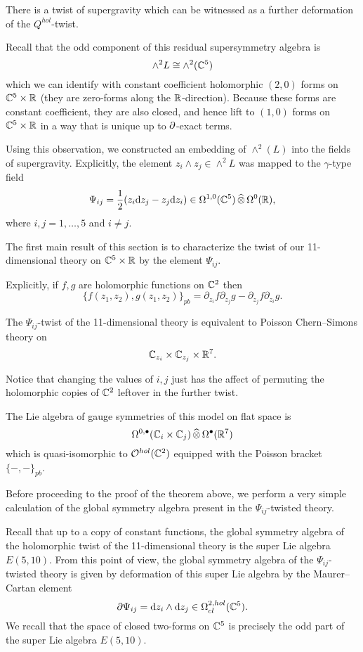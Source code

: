 \documentclass[11pt]{amsart}
\begin{document}
There is a twist of supergravity which can be witnessed as a further deformation of the $Q^{hol}$-twist. 

Recall that the odd component of this residual supersymmetry algebra is
\[
\wedge^2 L \cong \wedge^2(\mathbb C^5) 
\]
which we can identify with constant coefficient holomorphic $(2,0)$ forms on $\mathbb C^5 \times \mathbb R$ (they are zero-forms along the $\mathbb R$-direction). 
Because these forms are constant coefficient, they are also closed, and hence lift to $(1,0)$ forms on $\mathbb C^5 \times \mathbb R$ in a way that is unique up to $\partial$-exact terms. 

Using this observation, we constructed an embedding of $\wedge^2(L)$ into the fields of supergravity. 
Explicitly, the element $z_i \wedge z_j \in \wedge^2 L$ was mapped to the $\gamma$-type field
\[
\Psi_{ij} = \frac12 (z_i {\rm d} z_j - z_j {\rm d} z_i) \in \Omega^{1,0}(\mathbb C^5) \, \widehat{\otimes} \, \Omega^0(\mathbb R) ,
\]
where $i,j=1,\ldots, 5$ and $i \ne j$.  

\parsec[-] 

The first main result of this section is to characterize the twist of our 11-dimensional theory on $\mathbb C^5 \times \mathbb R$ by the element $\Psi_{ij}$. 

Explicitly, if $f,g$ are holomorphic functions on $\mathbb C^2$ then
\[
\{f(z_1,z_2) , g(z_1,z_2)\}_{pb} = \partial_{z_i} f \partial_{z_j} g - \partial_{z_j} f \partial_{z_i} g .
\]

\begin{thm}
The $\Psi_{ij}$-twist of the 11-dimensional theory is equivalent to Poisson Chern--Simons theory on 
\[
\mathbb C_{z_i} \times \mathbb C_{z_j} \times \mathbb R^7 .
\]
\end{thm}

Notice that changing the values of $i,j$ just has the affect of permuting the holomorphic copies of $\mathbb C^2$ leftover in the further twist. 

The Lie algebra of gauge symmetries of this model on flat space is 
\[
\Omega^{0,\bullet} (\mathbb C_i \times \mathbb C_j) \, \widehat{\otimes} \, \Omega^\bullet(\mathbb R^7) 
\]
which is quasi-isomorphic to $\mathcal O^{hol}(\mathbb C^2)$ equipped with the Poisson bracket $\{-,-\}_{pb}$. 

Before proceeding to the proof of the theorem above, we perform a very simple calculation of the global symmetry algebra present in the $\Psi_{ij}$-twisted theory. 

Recall that up to a copy of constant functions, the global symmetry algebra of the holomorphic twist of the 11-dimensional theory is the super Lie algebra $E(5,10)$.
From this point of view, the global symmetry algebra of the $\Psi_{ij}$-twisted theory is given by deformation of this super Lie algebra by the Maurer--Cartan element 
\[
\partial \Psi_{ij} = {\rm d} z_i \wedge {\rm d} z_j \in \Omega^{2,hol}_{cl}(\mathbb C^5) .
\]
We recall that the space of closed two-forms on $\mathbb C^5$ is precisely the odd part of the super Lie algebra $E(5,10)$. 
\end{document}
